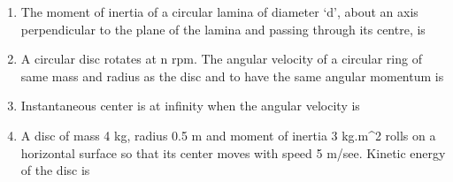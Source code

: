 \documentclass[11pt,a4paper]{article}
\begin{document}
\begin{enumerate}
{}
\\
\item{The moment of inertia of a circular lamina of diameter `d', about an axis perpendicular to the plane of the lamina and passing through its centre, is
}
\\
\item{A circular disc rotates at n rpm. The angular velocity of a circular ring of same mass and radius as the disc and to have the same angular momentum is}
\\
\item{Instantaneous center is at infinity when the angular velocity is}
\\
\item{A disc of mass 4 kg, radius 0.5 m and moment of inertia 3 kg.m\^{}2 rolls on a horizontal surface so that its center moves with speed 5 m/see. Kinetic energy of the disc is
}
\end{enumerate}
\end{document}
